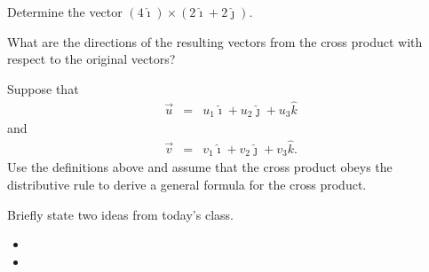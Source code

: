 \begin{problem}
\begin{subproblem}
  \item Determine the vector $\left( 4 \hat{\imath} \right)  \times  \left( 2 \hat{\imath} + 2\hat{\jmath}\right)$.
    \vfill

  \item What are the directions of the resulting vectors from the cross product with respect to the original vectors?
    \vspace{2em}

    \clearpage

  \item Suppose that
    \begin{eqnarray*}
      \vec{u} & = & u_1 \hat{\imath} + u_2 \hat{\jmath} + u_3 \hat{k}
    \end{eqnarray*}
    and
    \begin{eqnarray*}
      \vec{v} & = & v_1 \hat{\imath} + v_2 \hat{\jmath} + v_3 \hat{k}.
    \end{eqnarray*}
    Use the definitions above and assume that the cross product obeys
    the distributive rule to derive a general formula for the cross product.
    \vfill

  \end{subproblem}
\end{problem}


\postClass

\begin{problem}
\item Briefly state two ideas from today's class.
  \begin{itemize}
  \item
  \item
  \end{itemize}
\item
  \begin{subproblem}
    \item
  \end{subproblem}
\end{problem}


